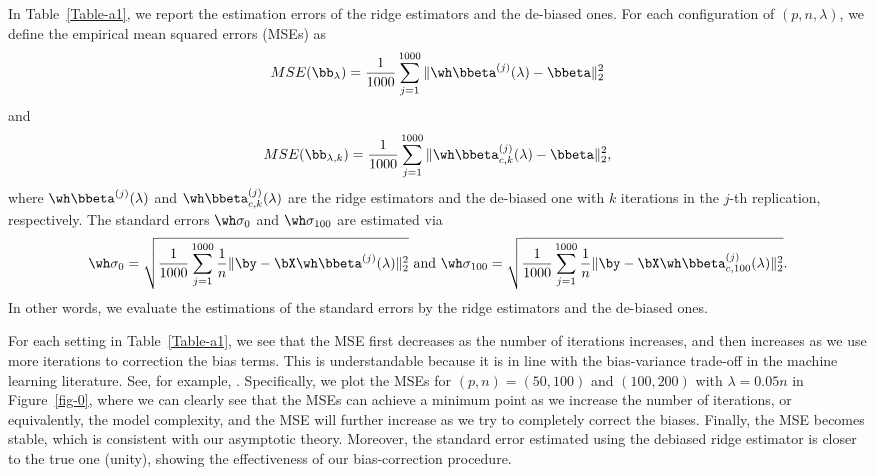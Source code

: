 In Table~\ref{Table-a1}, we report the estimation errors of the ridge estimators and the de-biased ones. For each configuration of $(p,n,\lambda)$, we define the empirical mean squared  errors (MSEs) as 
\begin{equation}\label{sse0}
    MSE(\bb_\lambda)=\frac{1}{1000}\sum_{j=1}^{1000}\|\wh\bbeta^{(j)}(\lambda)-\bbeta\|_2^2
\end{equation}
and
\begin{equation}\label{ssek}
      MSE(\bb_{\lambda,k})=\frac{1}{1000}\sum_{j=1}^{1000}\|\wh\bbeta_{c,k}^{(j)}(\lambda)-\bbeta\|_2^2,  
\end{equation}
where $\wh\bbeta^{(j)}(\lambda)$ and $\wh\bbeta_{c,k}^{(j)}(\lambda)$ are the ridge estimators and the de-biased one with $k$ iterations in the $j$-th replication, respectively. The standard errors $\wh\sigma_0$ and $\wh\sigma_{100}$
are estimated via
\begin{equation}\label{sigma:e}
    \wh\sigma_0=\sqrt{\frac{1}{1000}\sum_{j=1}^{1000}\frac{1}{n}\|\by-\bX\wh\bbeta^{(j)}(\lambda)\|_2^2}\,\,\text{and}\,\, \wh\sigma_{100}=\sqrt{\frac{1}{1000}\sum_{j=1}^{1000}\frac{1}{n}\|\by-\bX\wh\bbeta_{c,100}^{(j)}(\lambda)\|_2^2}.
\end{equation}
In other words, we evaluate the estimations of the standard errors by the ridge estimators and the de-biased ones.

For each setting in Table~\ref{Table-a1}, we see that the MSE first decreases as the number of iterations increases, and then increases as we use more iterations to correction the bias terms. This is understandable because it is in line with the bias-variance trade-off in the machine learning literature. See, for example, \cite{hastie2009elements}. Specifically, we plot the MSEs for $(p,n)=(50,100)$ and $(100,200)$ with $\lambda=0.05n$ in Figure~\ref{fig-0}, where we can clearly see that the MSEs can achieve a minimum point as we increase the number of iterations, or equivalently, the model complexity, and the MSE will further increase as we try to completely correct the biases. Finally, the MSE becomes stable, which is consistent with our asymptotic theory. Moreover, the standard error estimated using the debiased ridge estimator is closer to the true one (unity), showing the effectiveness of our bias-correction procedure.


